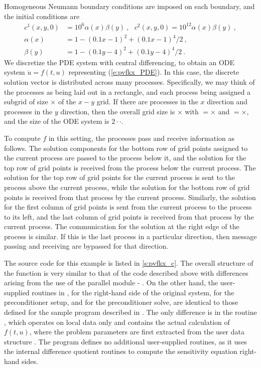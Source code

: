 Homogeneous Neumann boundary conditions are imposed on each boundary, and the
initial conditions are 
\begin{equation} \label{e:pvfkx_IC}
  \begin{split}
  c^{1}(x,y,0) &= 10^{6}\alpha (x)\beta (y) ~,~~~ 
                    c^{2}(x,y,0)=10^{12}\alpha(x)\beta (y) ~, \\
  \alpha (x) &= 1-(0.1x-1)^{2}+(0.1x-1)^{4}/2 ~, \\
  \beta (y) &= 1-(0.1y-4)^{2}+(0.1y-4)^{4}/2 ~.
  \end{split} 
\end{equation}
We discretize the PDE system with central differencing, to
obtain an ODE system ${\dot u} = f(t,u)$ representing (\ref{e:pvfkx_PDE}).  
In this case, the discrete solution vector is distributed across
many processes.  Specifically, we may think of the processes as
being laid out in a rectangle, and each process being assigned a
subgrid of size $\times$ of the $x-y$ grid. If
there are  processes in the $x$ direction and 
processes in the $y$ direction, then the overall grid size is
$\times$ with $=$$\times$ and
$=$$\times$, and the size of the ODE system is
$2\cdot$$\cdot$.  

To compute $f$ in this setting, the processes pass and receive
information as follows.  The solution components for the bottom row of
grid points assigned to the current process are passed to the process below
it, and the solution for the top row of grid points is received from
the process below the current process. The solution for the top
row of grid points for the current process is sent to the process
above the current process, while the solution for the bottom row of
grid points is received from that process by the current
process. Similarly, the solution for the first column of grid points
is sent from the current process to the process to its left, and
the last column of grid points is received from that process by the
current process. The communication for the solution at the right
edge of the process is similar. If this is the last process in a
particular direction, then message passing and receiving are bypassed
for that direction.

The source code for this example is listed in \A\ref{s:pvfkx_c}.
The overall structure of the  function is very
similar to that of the code  described above with 
differences arising from the use of the parallel {\nvector} module - {\nvecp}.
On the other hand, the user-supplied routines in ,
 for the right-hand side of the original system,
 for the preconditioner setup, and  for the
preconditioner solve, are identical to those defined for the sample program
 described in \cite{cvode2.4.0_ex}. The only difference is in the
routine , which operates on local data only and contains the actual 
calculation of $f(t,u)$, where the problem parameters are first extracted from
the user data structure . The program  defines no additional
user-supplied routines, as it uses the {\cvodes} internal difference quotient routines 
to compute the sensitivity equation right-hand sides.

